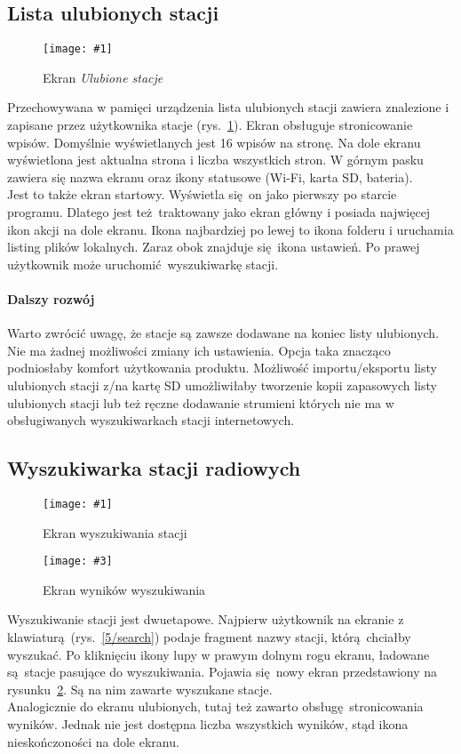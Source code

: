 \documentclass[12pt]{report}
\newcommand{\imgint}[4]{
	\begin{figure}[{#4}]
		\centering
		\texttt{[image: \#1]}
		\caption{#2}
		\label{#1}
	\end{figure}
}
\newcommand{\imgh}[3]{\imgint{#1}{#2}{#3}{H}}
\newcommand{\imgintss}[5]{
	\begin{figure}[{#5}]
		\centering
		\begin{minipage}{.45\textwidth}
			\centering
			\texttt{[image: \#1]}
			\caption{#2}
			\label{#1}
		\end{minipage}%
		\hfill
		\begin{minipage}{.45\textwidth}
			\centering
			\texttt{[image: \#3]}
			\caption{#4}
			\label{#3}
		\end{minipage}
	\end{figure}
}
\newcommand{\imghss}[4]{\imgintss{#1}{#2}{#3}{#4}{H}}
\begin{document}
		\subsection{Lista ulubionych stacji}
			\imgh{5/fav}{Ekran \textit{Ulubione stacje}}{0.5}
			Przechowywana w pamięci urządzenia lista ulubionych stacji zawiera znalezione i zapisane przez użytkownika stacje (rys.~\ref{5/fav}).
			Ekran obsługuje stronicowanie wpisów. Domyślnie wyświetlanych jest 16 wpisów na stronę. Na dole ekranu wyświetlona jest aktualna strona i liczba wszystkich stron.
			W górnym pasku zawiera się nazwa ekranu oraz ikony statusowe (Wi-Fi, karta SD, bateria).
			$ $\\
			
			Jest to także ekran startowy. Wyświetla się on jako pierwszy po starcie programu. Dlatego jest też traktowany jako ekran główny i posiada najwięcej ikon akcji na dole ekranu.
			Ikona najbardziej po lewej to ikona folderu i uruchamia listing plików lokalnych. Zaraz obok znajduje się ikona ustawień. Po prawej użytkownik może uruchomić wyszukiwarkę stacji.
			
			\paragraph{Dalszy rozwój}
				Warto zwrócić uwagę, że stacje są zawsze dodawane na koniec listy ulubionych. Nie ma żadnej możliwości zmiany ich ustawienia. Opcja taka znacząco podniosłaby komfort użytkowania produktu. Możliwość importu/eksportu listy ulubionych stacji z/na kartę SD umożliwiłaby tworzenie kopii zapasowych listy ulubionych stacji lub też ręczne dodawanie strumieni których nie ma w obsługiwanych wyszukiwarkach stacji internetowych.
			
		\subsection{Wyszukiwarka stacji radiowych}
			\imghss{5/search}{Ekran wyszukiwania stacji}{5/searchres}{Ekran wyników wyszukiwania}
			Wyszukiwanie stacji jest dwuetapowe. Najpierw użytkownik na ekranie z klawiaturą (rys.~\ref{5/search}) podaje fragment nazwy stacji, którą chciałby wyszukać. Po kliknięciu ikony lupy w prawym dolnym rogu ekranu, ładowane są stacje pasujące do wyszukiwania. Pojawia się nowy ekran przedstawiony na rysunku~\ref{5/searchres}. Są na nim zawarte wyszukane stacje.
			$ $\\
			
			Analogicznie do ekranu ulubionych, tutaj też zawarto obsługę stronicowania wyników. Jednak nie jest dostępna liczba wszystkich wyników, stąd ikona nieskończoności na dole ekranu.
			
\end{document}
